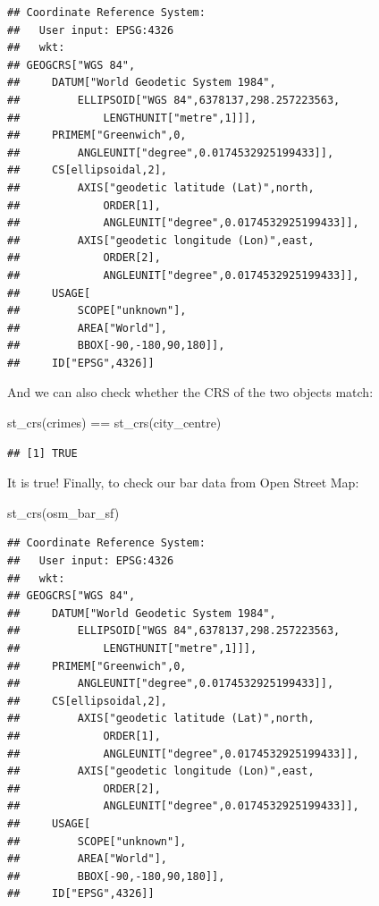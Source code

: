 \documentclass[
]{book}
\newenvironment{Shaded}{\begin{snugshade}}{\end{snugshade}}
\newcommand{\FunctionTok}[1]{\textcolor[rgb]{0.00,0.00,0.00}{#1}}
\newcommand{\NormalTok}[1]{#1}
\newcommand{\SpecialCharTok}[1]{\textcolor[rgb]{0.00,0.00,0.00}{#1}}
\begin{document}
\begin{verbatim}
## Coordinate Reference System:
##   User input: EPSG:4326 
##   wkt:
## GEOGCRS["WGS 84",
##     DATUM["World Geodetic System 1984",
##         ELLIPSOID["WGS 84",6378137,298.257223563,
##             LENGTHUNIT["metre",1]]],
##     PRIMEM["Greenwich",0,
##         ANGLEUNIT["degree",0.0174532925199433]],
##     CS[ellipsoidal,2],
##         AXIS["geodetic latitude (Lat)",north,
##             ORDER[1],
##             ANGLEUNIT["degree",0.0174532925199433]],
##         AXIS["geodetic longitude (Lon)",east,
##             ORDER[2],
##             ANGLEUNIT["degree",0.0174532925199433]],
##     USAGE[
##         SCOPE["unknown"],
##         AREA["World"],
##         BBOX[-90,-180,90,180]],
##     ID["EPSG",4326]]
\end{verbatim}

And we can also check whether the CRS of the two objects match:

\begin{Shaded}
\begin{Highlighting}[]
\FunctionTok{st\_crs}\NormalTok{(crimes) }\SpecialCharTok{==} \FunctionTok{st\_crs}\NormalTok{(city\_centre)}
\end{Highlighting}
\end{Shaded}

\begin{verbatim}
## [1] TRUE
\end{verbatim}

It is true! Finally, to check our bar data from Open Street Map:

\begin{Shaded}
\begin{Highlighting}[]
\FunctionTok{st\_crs}\NormalTok{(osm\_bar\_sf)}
\end{Highlighting}
\end{Shaded}

\begin{verbatim}
## Coordinate Reference System:
##   User input: EPSG:4326 
##   wkt:
## GEOGCRS["WGS 84",
##     DATUM["World Geodetic System 1984",
##         ELLIPSOID["WGS 84",6378137,298.257223563,
##             LENGTHUNIT["metre",1]]],
##     PRIMEM["Greenwich",0,
##         ANGLEUNIT["degree",0.0174532925199433]],
##     CS[ellipsoidal,2],
##         AXIS["geodetic latitude (Lat)",north,
##             ORDER[1],
##             ANGLEUNIT["degree",0.0174532925199433]],
##         AXIS["geodetic longitude (Lon)",east,
##             ORDER[2],
##             ANGLEUNIT["degree",0.0174532925199433]],
##     USAGE[
##         SCOPE["unknown"],
##         AREA["World"],
##         BBOX[-90,-180,90,180]],
##     ID["EPSG",4326]]
\end{verbatim}
\end{document}
